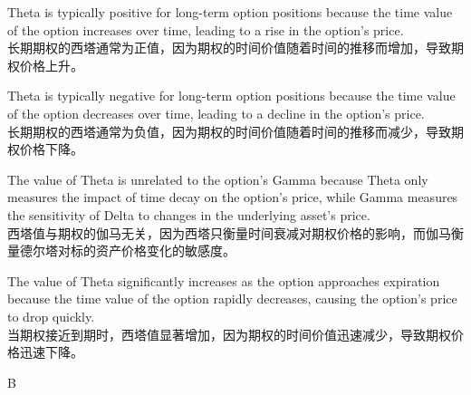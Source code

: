 \documentclass{article}
\begin{document}
\begin{choices}
    \item Theta is typically positive for long-term option positions because the time value of the option increases over time, leading to a rise in the option's price.\\
    长期期权的西塔通常为正值，因为期权的时间价值随着时间的推移而增加，导致期权价格上升。
    \item Theta is typically negative for long-term option positions because the time value of the option decreases over time, leading to a decline in the option's price.\\
    长期期权的西塔通常为负值，因为期权的时间价值随着时间的推移而减少，导致期权价格下降。
    \item The value of Theta is unrelated to the option's Gamma because Theta only measures the impact of time decay on the option's price, while Gamma measures the sensitivity of Delta to changes in the underlying asset's price.\\
    西塔值与期权的伽马无关，因为西塔只衡量时间衰减对期权价格的影响，而伽马衡量德尔塔对标的资产价格变化的敏感度。
    \item The value of Theta significantly increases as the option approaches expiration because the time value of the option rapidly decreases, causing the option's price to drop quickly.\\
    当期权接近到期时，西塔值显著增加，因为期权的时间价值迅速减少，导致期权价格迅速下降。
\end{choices}

\begin{correctanswer}
    B
\end{correctanswer}
\end{document}
